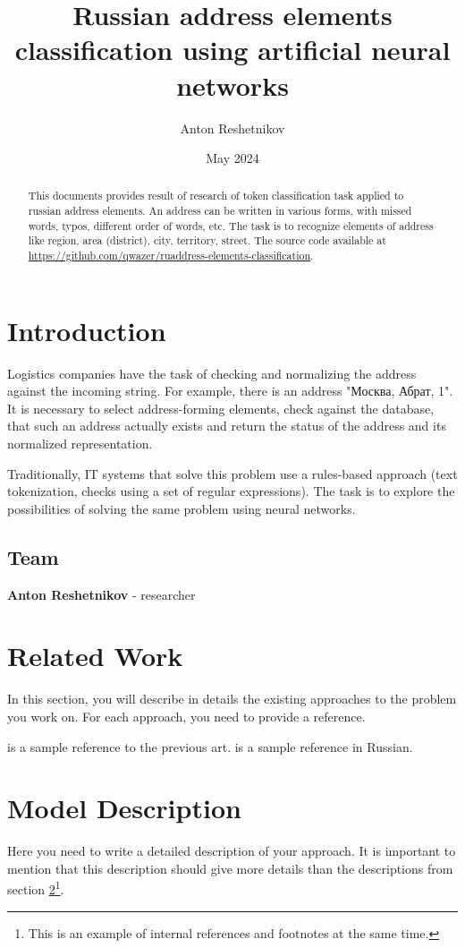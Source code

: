 \documentclass{article}
\title{Russian address elements classification using artificial neural networks}
\author{Anton Reshetnikov}
\date{May 2024}
\begin{document}
\maketitle
\begin{abstract}
    This documents provides result of research of token classification task applied to russian address elements.
    An address can be written in various forms, with missed words, typos, different order of words, etc.
    The task is to recognize elements of address like region, area (district), city, territory, street.
    The source code available at
     \url{https://github.com/qwazer/ruaddress-elements-classification}.
\end{abstract}



\section{Introduction}

Logistics companies have the task of checking and normalizing the address against the incoming string.
For example, there is an address "Москва, Абрат, 1".
It is necessary to select address-forming elements, check against the database,
that such an address actually exists and return the status of the address and its normalized representation.

Traditionally, IT systems that solve this problem use a rules-based approach (text tokenization, checks using a set of regular expressions).
The task is to explore the possibilities of solving the same problem using neural networks.

\subsection{Team}

\textbf{Anton Reshetnikov} - researcher



\section{Related Work}
\label{sec:related}
In this section, you will describe in details the existing approaches to the problem you work on. For each approach, you need to provide a reference.

\cite{levenshtein1966dvoichnie} is a sample reference to the previous art. \cite{levenshtein1966dvoichnie} is a sample reference in Russian.

\section{Model Description}
Here you need to write a detailed description of your approach. \cite{vaswani2023attention}
It is important to mention that this description should give more details than the descriptions from section \ref{sec:related}\footnote{This is an example of internal references and footnotes at the same time.}.
\end{document}
